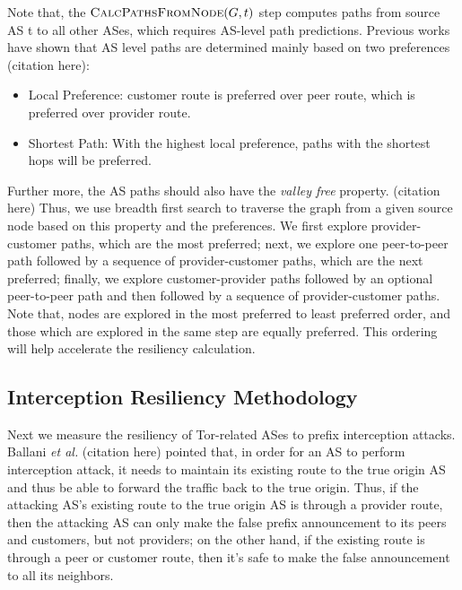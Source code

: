 Note that, the $\Call{CalcPathsFromNode}{G,t}$ step computes paths from source AS t to all other ASes, which requires AS-level path predictions. Previous works have shown that AS level paths are determined mainly based on two preferences (citation here):

\begin{itemize}
\item Local Preference: customer route is preferred over peer route, which is preferred over provider route. 
\item Shortest Path: With the highest local preference, paths with the shortest hops will be preferred. 
\end{itemize}

Further more, the AS paths should also have the \emph{valley free} property. (citation here) Thus, we use breadth first search to traverse the graph from a given source node based on this property and the preferences. We first explore provider-customer paths, which are the most preferred; next, we explore one peer-to-peer path followed by a sequence of provider-customer paths, which are the next preferred; finally, we explore customer-provider paths followed by an optional peer-to-peer path and then followed by a sequence of provider-customer paths. Note that, nodes are explored in the most preferred to least preferred order, and those which are explored in the same step are equally preferred. This ordering will help accelerate the resiliency calculation. 



\subsection{Interception Resiliency Methodology}
Next we measure the resiliency of Tor-related ASes to prefix interception attacks. Ballani \emph{et al.} (citation here) pointed that, in order for an AS to perform interception attack, it needs to maintain its existing route to the true origin AS and thus be able to forward the traffic back to the true origin. Thus, if the attacking AS's existing route to the true origin AS is through a provider route, then the attacking AS can only make the false prefix announcement to its peers and customers, but not providers; on the other hand, if the existing route is through a peer or customer route, then it's safe to make the false announcement to all its neighbors. 

